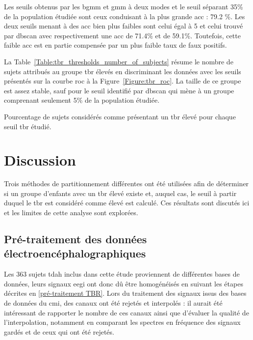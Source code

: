Les seuils obtenus par les \gls{bgmm} et \gls{gmm} à deux modes et le seuil séparant 35\% de la population étudiée sont ceux conduisant à la plus grande \gls{acc} :
79.2 \%. Les deux seuils menant à des \gls{acc} bien plus faibles sont celui égal à 5 et celui trouvé par \gls{dbscan} avec respectivement une \gls{acc} de 71.4\%
et de 59.1\%. Toutefois, cette faible \gls{acc} est en partie compensée par un plus faible taux de faux positifs.

La Table~\ref{Table:tbr_thresholds_number_of_subjects} résume le nombre de sujets attribués au groupe \gls{tbr} élevés en discriminant les données 
avec les seuils présentés sur la courbe \gls{roc} à la Figure~\ref{Figure:tbr_roc}. La taille de ce groupe est assez stable, sauf pour le seuil identifié 
par \gls{dbscan} qui mène à un groupe comprenant seulement 5\% de la population étudiée.
\begin{table}[h!]
  \centering
  \caption[Pourcentage de sujets considérés comme présentant un  élevé pour chaque seuil \gls{tbr} étudié.]{Pourcentage 
	de sujets considérés comme présentant un \gls{tbr} élevé pour chaque seuil \gls{tbr} étudié.}
  
  \label{Table:tbr_thresholds_number_of_subjects}
\end{table}


\section{Discussion}

Trois méthodes de partitionnement différentes ont été utilisées afin de déterminer si un groupe d'enfants avec un \gls{tbr} élevé existe et, auquel cas, 
le seuil à partir duquel le \gls{tbr} est considéré comme élevé est calculé. Ces résultats sont discutés ici et les limites de cette analyse sont 
explorées.

\subsection{Pré-traitement des données électroencéphalographiques}

Les 363 sujets \gls{tdah} inclus dans cette étude proviennent de différentes bases de données, leurs signaux \gls{eegi} ont donc dû être homogénéisés 
en suivant les étapes décrites en \ref{pré-traitement TBR}. Lors du traitement des signaux issus des bases de données du \gls{cmi}, des canaux ont 
été rejetés et interpolés : il aurait été intéressant de rapporter le nombre de ces canaux ainsi que d'évaluer la qualité de l'interpolation, notamment 
en comparant les spectres en fréquence des signaux gardés et de ceux qui ont été rejetés. 

